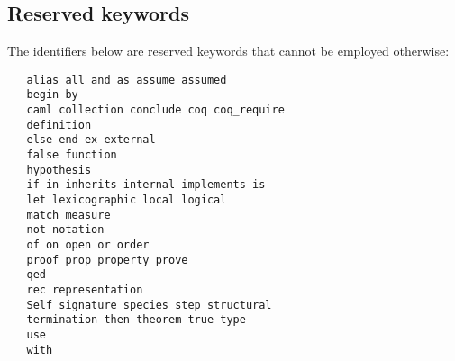 \subsection{Reserved keywords}
The identifiers below are reserved keywords that cannot be employed
otherwise:
\begin{verbatim}
   alias all and as assume assumed
   begin by
   caml collection conclude coq coq_require
   definition
   else end ex external
   false function
   hypothesis
   if in inherits internal implements is
   let lexicographic local logical
   match measure
   not notation
   of on open or order
   proof prop property prove
   qed
   rec representation
   Self signature species step structural
   termination then theorem true type
   use
   with
\end{verbatim}
